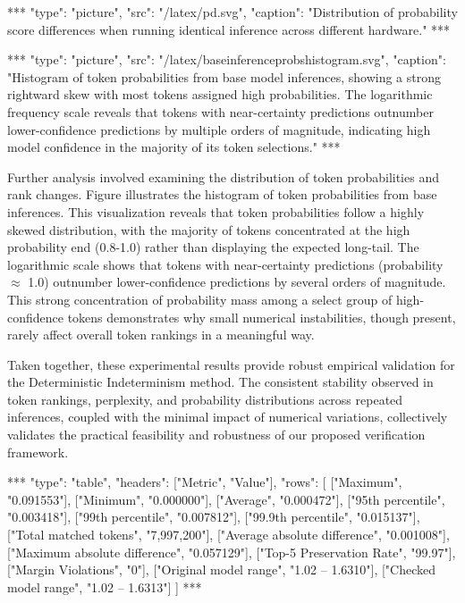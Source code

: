 \documentclass{article}
\begin{document}
\begin{center}
***
"type": "picture",
"src": "/latex/pd.svg",
"caption": "Distribution of probability score differences when running identical inference across different hardware."
***
\end{center}

\begin{center}
***
"type": "picture",
"src": "/latex/baseinferenceprobshistogram.svg",
"caption": "Histogram of token probabilities from base model inferences, showing a strong rightward skew with most tokens assigned high probabilities. The logarithmic frequency scale reveals that tokens with near-certainty predictions outnumber lower-confidence predictions by multiple orders of magnitude, indicating high model confidence in the majority of its token selections."
***
\end{center}

Further analysis involved examining the distribution of token probabilities and rank changes. Figure illustrates the histogram of token probabilities from base inferences. This visualization reveals that token probabilities follow a highly skewed distribution, with the majority of tokens concentrated at the high probability end (0.8-1.0) rather than displaying the expected long-tail. The logarithmic scale shows that tokens with near-certainty predictions (probability $\approx$ 1.0) outnumber lower-confidence predictions by several orders of magnitude. This strong concentration of probability mass among a select group of high-confidence tokens demonstrates why small numerical instabilities, though present, rarely affect overall token rankings in a meaningful way.

Taken together, these experimental results provide robust empirical validation for the Deterministic Indeterminism method.  The consistent stability observed in token rankings, perplexity, and probability distributions across repeated inferences, coupled with the minimal impact of numerical variations, collectively validates the practical feasibility and robustness of our proposed verification framework.

\begin{center}
***
"type": "table",
"headers": ["Metric", "Value"],
"rows": [
    ["Maximum", "0.091553"],
    ["Minimum", "0.000000"],
    ["Average", "0.000472"],
    ["95th percentile", "0.003418"],
    ["99th percentile", "0.007812"],
    ["99.9th percentile", "0.015137"],
    ["Total matched tokens", "7,997,200"],
    ["Average absolute difference", "0.001008"],
    ["Maximum absolute difference", "0.057129"],
    ["Top-5 Preservation Rate", "99.97"],
    ["Margin Violations", "0"],
    ["Original model range", "1.02 -- 1.6310"],
    ["Checked model range", "1.02 -- 1.6313"]
]
***
\end{center}
\end{document}
